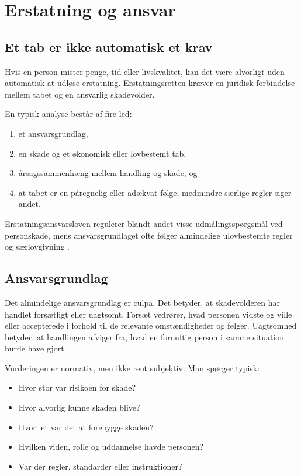 \chapter{Erstatning og ansvar}


\section{Et tab er ikke automatisk et krav}

Hvis en person mister penge, tid eller livskvalitet, kan det være alvorligt uden automatisk at udløse erstatning. Erstatningsretten kræver en juridisk forbindelse mellem tabet og en ansvarlig skadevolder.

En typisk analyse består af fire led:
\begin{enumerate}
  \item et ansvarsgrundlag,
  \item en skade og et økonomisk eller lovbestemt tab,
  \item årsagssammenhæng mellem handling og skade, og
  \item at tabet er en påregnelig eller adækvat følge, medmindre særlige regler siger andet.
\end{enumerate}

Erstatningsansvarsloven regulerer blandt andet visse udmålingsspørgsmål ved personskade, mens ansvarsgrundlaget ofte følger almindelige ulovbestemte regler og særlovgivning \citep{erstatningsansvar}.

\section{Ansvarsgrundlag}

Det almindelige ansvarsgrundlag er culpa. Det betyder, at skadevolderen har handlet forsætligt eller uagtsomt. Forsæt vedrører, hvad personen vidste og ville eller accepterede i forhold til de relevante omstændigheder og følger. Uagtsomhed betyder, at handlingen afviger fra, hvad en fornuftig person i samme situation burde have gjort.

Vurderingen er normativ, men ikke rent subjektiv. Man spørger typisk:
\begin{itemize}
  \item Hvor stor var risikoen for skade?
  \item Hvor alvorlig kunne skaden blive?
  \item Hvor let var det at forebygge skaden?
  \item Hvilken viden, rolle og uddannelse havde personen?
  \item Var der regler, standarder eller instruktioner?
\end{itemize}

